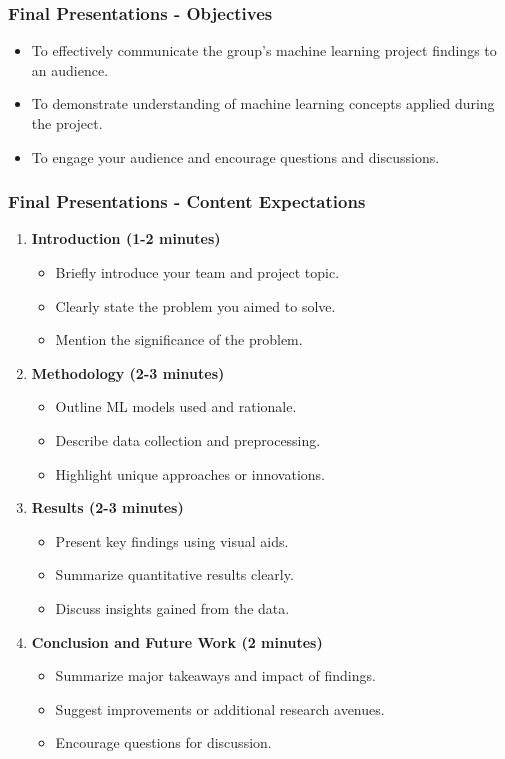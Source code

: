 \documentclass[aspectratio=169]{beamer}
\begin{document}
\begin{frame}[fragile]
    \frametitle{Final Presentations - Objectives}
    \begin{itemize}
        \item To effectively communicate the group's machine learning project findings to an audience.
        \item To demonstrate understanding of machine learning concepts applied during the project.
        \item To engage your audience and encourage questions and discussions.
    \end{itemize}
\end{frame}

\begin{frame}[fragile]
    \frametitle{Final Presentations - Content Expectations}
    \begin{enumerate}
        \item \textbf{Introduction (1-2 minutes)}
            \begin{itemize}
                \item Briefly introduce your team and project topic.
                \item Clearly state the problem you aimed to solve.
                \item Mention the significance of the problem.
            \end{itemize}
        \item \textbf{Methodology (2-3 minutes)}
            \begin{itemize}
                \item Outline ML models used and rationale.
                \item Describe data collection and preprocessing.
                \item Highlight unique approaches or innovations.
            \end{itemize}
        \item \textbf{Results (2-3 minutes)}
            \begin{itemize}
                \item Present key findings using visual aids.
                \item Summarize quantitative results clearly.
                \item Discuss insights gained from the data.
            \end{itemize}
        \item \textbf{Conclusion and Future Work (2 minutes)}
            \begin{itemize}
                \item Summarize major takeaways and impact of findings.
                \item Suggest improvements or additional research avenues.
                \item Encourage questions for discussion.
            \end{itemize}
    \end{enumerate}
\end{frame}
\end{document}
